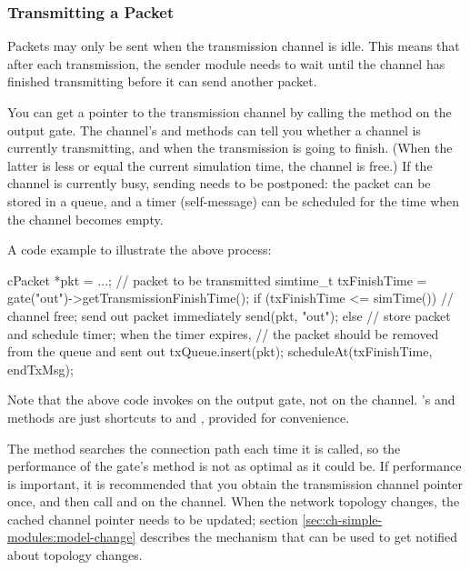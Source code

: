 \subsubsection{Transmitting a Packet}

Packets may only be sent when the transmission channel is idle.
This means that after each transmission, the sender module needs
to wait until the channel has finished transmitting before it can
send another packet.

You can get a pointer to the transmission channel by calling the
 method on the output gate.
The channel's  and 
methods can tell you whether a channel is currently transmitting,
and when the transmission is going to finish. (When the latter is
less or equal the current simulation time, the channel is free.)
If the channel is currently busy, sending needs to be postponed:
the packet can be stored in a queue, and a timer (self-message) can be
scheduled for the time when the channel becomes empty.

A code example to illustrate the above process:

\begin{cpp}
cPacket *pkt = ...; // packet to be transmitted
simtime_t txFinishTime = gate("out")->getTransmissionFinishTime();
if (txFinishTime <= simTime())
{
    // channel free; send out packet immediately
    send(pkt, "out");
}
else
{
    // store packet and schedule timer; when the timer expires,
    // the packet should be removed from the queue and sent out
    txQueue.insert(pkt);
    scheduleAt(txFinishTime, endTxMsg);
}
\end{cpp}

Note that the above code invokes  on the
output gate, not on the channel. 's
 and  methods are just
shortcuts to  and
, provided for
convenience.

The  method searches the connection path each
time it is called, so the performance of the gate's
 method is not as optimal as it could be.
If performance is important, it is recommended that you obtain the
transmission channel pointer once, and then call  and
 on the channel. When the network topology
changes, the cached channel pointer needs to be updated; section
\ref{sec:ch-simple-modules:model-change} describes the mechanism that can
be used to get notified about topology changes.

